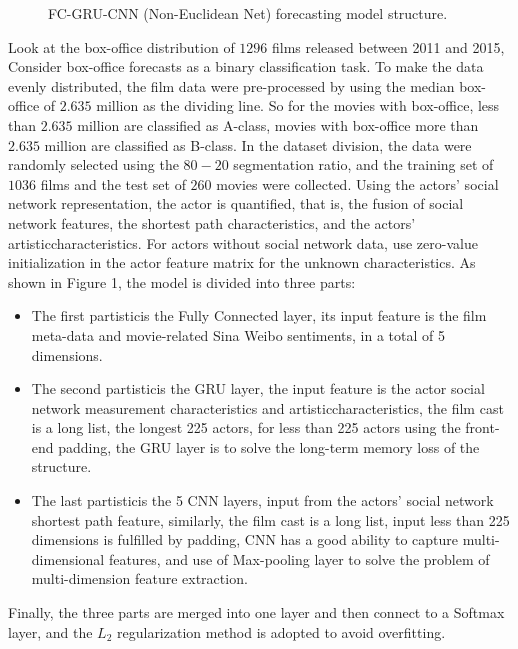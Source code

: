 \documentclass[review]{cvpr}
\begin{document}
\begin{figure*}
\begin{center}
\end{center}
   \caption{FC-GRU-CNN (Non-Euclidean Net) forecasting model structure.}
\label{fig:short}
\end{figure*}

Look at the box-office distribution of $1296$ films released between 2011 and 2015,
Consider box-office forecasts as a binary classification task.
To make the data evenly distributed, the film data were pre-processed by using the median box-office of $2.635$ million as the dividing line.
So for the movies with box-office, less than $2.635$ million are classified as A-class, movies with box-office more than $2.635$ million are classified as B-class.
In the dataset division, the data were randomly selected using the $80-20$ segmentation ratio, and the training set of $1036$ films and the test set of $260$ movies were collected.
Using the actors' social network representation, the actor is quantified, that is,
the fusion of social network features, the shortest path characteristics, and the actors' artisticcharacteristics.
For actors without social network data, use zero-value initialization in the actor feature matrix for the unknown characteristics.
As shown in Figure 1, the model is divided into three parts:

\begin{itemize}
\item The first partisticis the Fully Connected layer, its input feature is the film meta-data and movie-related Sina Weibo sentiments, in a total of 5 dimensions.
\item The second partisticis the GRU layer, the input feature is the actor social network measurement characteristics and artisticcharacteristics, the film cast is a long list,
the longest 225 actors, for less than 225 actors using the front-end padding, the GRU layer is to solve the long-term memory loss of the structure.
\item The last partisticis the 5 CNN layers, input from the actors' social network shortest path feature, similarly, the film cast is a long list,
input less than 225 dimensions is fulfilled by padding, CNN has a good ability to capture multi-dimensional features, and use of Max-pooling layer to solve the problem of multi-dimension feature extraction.
\end{itemize}
Finally, the three parts are merged into one layer and then connect to a Softmax layer, and the $L_2$ regularization method is adopted to avoid overfitting.
\end{document}
